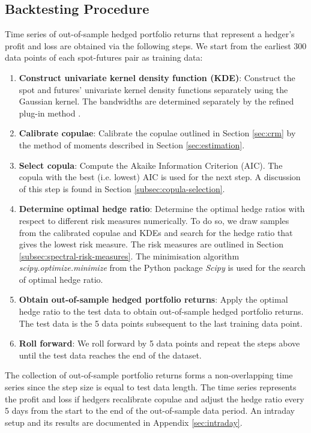 \documentclass[11pt,a4paper,english]{article}
\begin{document}
\subsection{Backtesting Procedure}\label{sec:empirical-procedure}
Time series of out-of-sample hedged portfolio returns that represent a hedger's profit and loss are obtained via the following steps.
We start from the earliest 300 data points of each spot-futures pair as training data:
\begin{enumerate}
\item \textbf{Construct univariate kernel density function (KDE)}:
  Construct the spot and futures' univariate kernel density functions separately
  using the Gaussian kernel. The bandwidths are determined separately by the refined plug-in method \citep[Section
  3.3.3]{hardle2004nonparametric}.
\item \textbf{Calibrate copulae}:
  Calibrate the copulae outlined in Section \ref{sec:crm} by the
  method of moments described in Section \ref{sec:estimation}.
\item \textbf{Select copula}:
  Compute the Akaike Information Criterion (AIC). The copula with the
  best (i.e. lowest) AIC is used for the next step. 
  A discussion of this step is found in Section \ref{subsec:copula-selection}.
\item \textbf{Determine optimal hedge ratio}:
  Determine the optimal hedge ratios with respect to different
  risk measures numerically. 
  To do so, we draw samples from the calibrated copulae and KDEs 
  and search for the hedge ratio that gives the lowest risk measure. 
  The risk measures are outlined in Section \ref{subsec:spectral-risk-measures}.
  The minimisation algorithm \textit{scipy.optimize.minimize} from the Python package {\em Scipy} \citep{2020SciPy-NMeth} is used for the search of optimal hedge ratio.
\item \textbf{Obtain out-of-sample hedged portfolio returns}: Apply the optimal hedge ratio to the test data to obtain out-of-sample hedged portfolio returns.
      The test data is the 5 data points subsequent to the last training data point. 
\item \textbf{Roll forward}: We roll forward by 5 data points and repeat the steps above until the test data reaches the end of the dataset.
\end{enumerate}

The collection of out-of-sample portfolio returns forms a non-overlapping time series since the step size is equal to test data length.
The time series represents the profit and loss if hedgers recalibrate copulae and adjust the hedge ratio every 5 days from the start to the end of the out-of-sample data period.
An intraday setup and its results are documented in Appendix \ref{sec:intraday}. 
\end{document}
